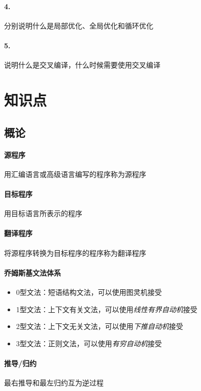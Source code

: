 \documentclass[UTF8]{ctexart} %
\begin{document}
\paragraph{4.} 分别说明什么是局部优化、全局优化和循环优化

\paragraph{5.} 说明什么是交叉编译，什么时候需要使用交叉编译

\section{知识点}

\subsection{概论}

\paragraph{源程序} 用汇编语言或高级语言编写的程序称为源程序

\paragraph{目标程序} 用目标语言所表示的程序

\paragraph{翻译程序} 将源程序转换为目标程序的程序称为翻译程序

\paragraph{乔姆斯基文法体系}

\begin{itemize}
    \item 0型文法：短语结构文法，可以使用图灵机接受
    \item 1型文法：上下文有关文法，可以使用\emph{线性有界自动机}接受
    \item 2型文法：上下文无关文法，可以使用\emph{下推自动机}接受
    \item 3型文法：正则文法，可以使用\emph{有穷自动机}接受
\end{itemize}

\paragraph{推导/归约} 最右推导和最左归约互为逆过程
\end{document}
